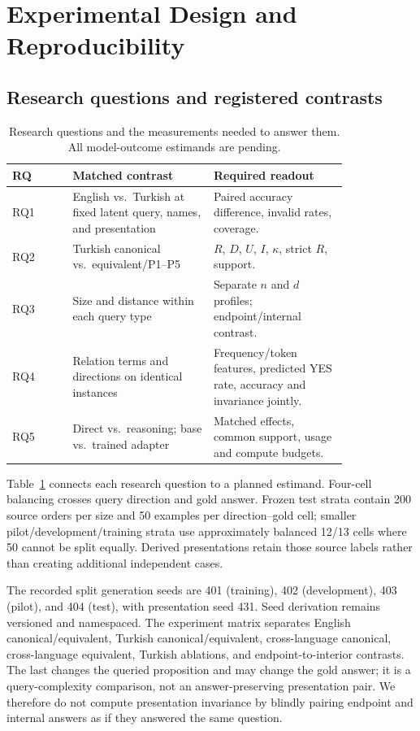 \section{Experimental Design and Reproducibility}

\subsection{Research questions and registered contrasts}

\begin{table}[t]
  \centering
  \caption{Research questions and the measurements needed to answer them. All model-outcome estimands are
  pending.}
  \label{tab:rqs}
  \small
  \begin{tabular}{@{}lp{0.42\linewidth}p{0.40\linewidth}@{}}
    \toprule
    RQ & Matched contrast & Required readout \\
    \midrule
    RQ1 & English vs.\ Turkish at fixed latent query, names, and presentation &
      Paired accuracy difference, invalid rates, coverage. \\
    RQ2 & Turkish canonical vs.\ equivalent/P1--P5 &
      $R$, $D$, $U$, $I$, $\kappa$, strict $R$, support. \\
    RQ3 & Size and distance within each query type &
      Separate $n$ and $d$ profiles; endpoint/internal contrast. \\
    RQ4 & Relation terms and directions on identical instances &
      Frequency/token features, predicted YES rate, accuracy and invariance jointly. \\
    RQ5 & Direct vs.\ reasoning; base vs.\ trained adapter &
      Matched effects, common support, usage and compute budgets. \\
    \bottomrule
  \end{tabular}
\end{table}

Table~\ref{tab:rqs} connects each research question to a planned estimand. Four-cell balancing crosses
query direction and gold answer. Frozen test strata contain 200 source orders per size and 50 examples per
direction--gold cell; smaller pilot/development/training strata use approximately balanced 12/13 cells where
50 cannot be split equally. Derived presentations retain those source labels rather than creating additional
independent cases.

The recorded split generation seeds are 401 (training), 402 (development), 403 (pilot), and 404 (test),
with presentation seed 431. Seed derivation remains versioned and namespaced. The experiment matrix
separates English canonical/equivalent, Turkish canonical/equivalent, cross-language canonical,
cross-language equivalent, Turkish ablations, and endpoint-to-interior contrasts. The last changes the
queried proposition and may change the gold answer; it is a query-complexity comparison, not an
answer-preserving presentation pair. We therefore do not compute presentation invariance by blindly pairing
endpoint and internal answers as if they answered the same question.


